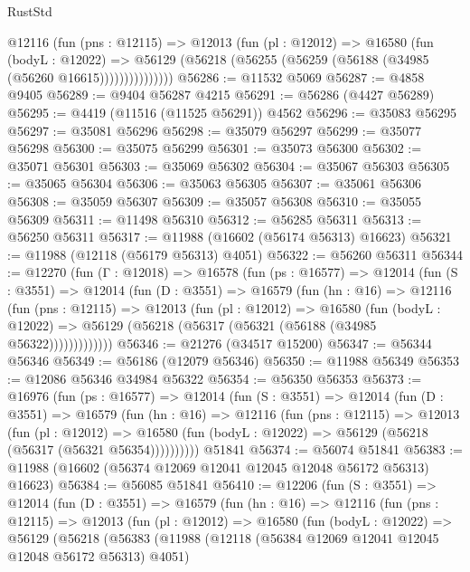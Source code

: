 \begin{lexlean}{RustStd}
\begin{coremodule}
              @12116
                (fun (pns : @12115) =>
                @12013
                  (fun (pl : @12012) =>
                  @16580
                    (fun (bodyL : @12022) =>
                    @56129 (@56218 (@56255 (@56259 (@56188 (@34985 (@56260 @16615)))))))))))))))
@56286 := @11532 @5069
@56287 := @4858 @9405
@56289 := @9404 @56287 @4215
@56291 := @56286 (@4427 @56289)
@56295 := @4419 (@11516 (@11525 @56291)) @4562
@56296 := @35083 @56295
@56297 := @35081 @56296
@56298 := @35079 @56297
@56299 := @35077 @56298
@56300 := @35075 @56299
@56301 := @35073 @56300
@56302 := @35071 @56301
@56303 := @35069 @56302
@56304 := @35067 @56303
@56305 := @35065 @56304
@56306 := @35063 @56305
@56307 := @35061 @56306
@56308 := @35059 @56307
@56309 := @35057 @56308
@56310 := @35055 @56309
@56311 := @11498 @56310
@56312 := @56285 @56311
@56313 := @56250 @56311
@56317 := @11988 (@16602 (@56174 @56313) @16623)
@56321 := @11988 (@12118 (@56179 @56313) @4051)
@56322 := @56260 @56311
@56344 := @12270
    (fun (Γ : @12018) =>
    @16578
      (fun (ps : @16577) =>
      @12014
        (fun (S : @3551) =>
        @12014
          (fun (D : @3551) =>
          @16579
            (fun (hn : @16) =>
            @12116
              (fun (pns : @12115) =>
              @12013
                (fun (pl : @12012) =>
                @16580
                  (fun (bodyL : @12022) =>
                  @56129 (@56218 (@56317 (@56321 (@56188 (@34985 @56322)))))))))))))
@56346 := @21276 (@34517 @15200)
@56347 := @56344 @56346
@56349 := @56186 (@12079 @56346)
@56350 := @11988 @56349
@56353 := @12086 @56346 @34984 @56322
@56354 := @56350 @56353
@56373 := @16976
    (fun (ps : @16577) =>
    @12014
      (fun (S : @3551) =>
      @12014
        (fun (D : @3551) =>
        @16579
          (fun (hn : @16) =>
          @12116
            (fun (pns : @12115) =>
            @12013
              (fun (pl : @12012) =>
              @16580 (fun (bodyL : @12022) => @56129 (@56218 (@56317 (@56321 @56354))))))))))
    @51841
@56374 := @56074 @51841
@56383 := @11988 (@16602 (@56374 @12069 @12041 @12045 @12048 @56172 @56313) @16623)
@56384 := @56085 @51841
@56410 := @12206
    (fun (S : @3551) =>
    @12014
      (fun (D : @3551) =>
      @16579
        (fun (hn : @16) =>
        @12116
          (fun (pns : @12115) =>
          @12013
            (fun (pl : @12012) =>
            @16580
              (fun (bodyL : @12022) =>
              @56129
                (@56218
                  (@56383
                    (@11988
                      (@12118 (@56384 @12069 @12041 @12045 @12048 @56172 @56313) @4051)

\end{coremodule}
\end{lexlean}
